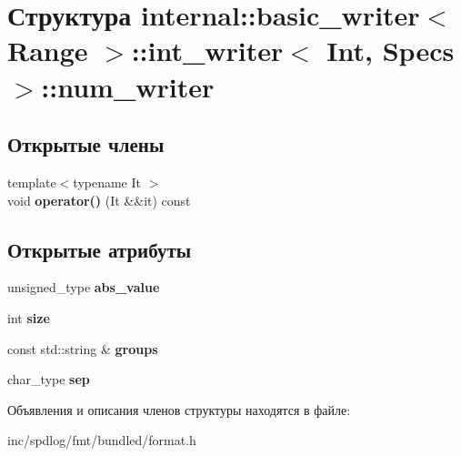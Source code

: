 \hypertarget{structinternal_1_1basic__writer_1_1int__writer_1_1num__writer}{}\section{Структура internal\+:\+:basic\+\_\+writer$<$ Range $>$\+:\+:int\+\_\+writer$<$ Int, Specs $>$\+:\+:num\+\_\+writer}
\label{structinternal_1_1basic__writer_1_1int__writer_1_1num__writer}
\subsection*{Открытые члены}
\begin{DoxyCompactItemize}
\item 
\mbox{\label{structinternal_1_1basic__writer_1_1int__writer_1_1num__writer_a1312e5aabcdbc13a4854aa8ce9b42dd0}} 
{\footnotesize template$<$typename It $>$ }\\void {\bfseries operator()} (It \&\&it) const
\end{DoxyCompactItemize}
\subsection*{Открытые атрибуты}
\begin{DoxyCompactItemize}
\item 
\mbox{\label{structinternal_1_1basic__writer_1_1int__writer_1_1num__writer_a8dee3d7efdcb7ab8a358a67faba6bd02}} 
unsigned\+\_\+type {\bfseries abs\+\_\+value}
\item 
\mbox{\label{structinternal_1_1basic__writer_1_1int__writer_1_1num__writer_ac8170f8fa84a1f8102ad83e449ecccd2}} 
int {\bfseries size}
\item 
\mbox{\label{structinternal_1_1basic__writer_1_1int__writer_1_1num__writer_a878093f8e165a3cf37b385be47b7cda8}} 
const std\+::string \& {\bfseries groups}
\item 
\mbox{\label{structinternal_1_1basic__writer_1_1int__writer_1_1num__writer_ae42cfc569b60137644aaad91b8d8c38c}} 
char\+\_\+type {\bfseries sep}
\end{DoxyCompactItemize}


Объявления и описания членов структуры находятся в файле\+:\begin{DoxyCompactItemize}
\item 
inc/spdlog/fmt/bundled/format.\+h\end{DoxyCompactItemize}
